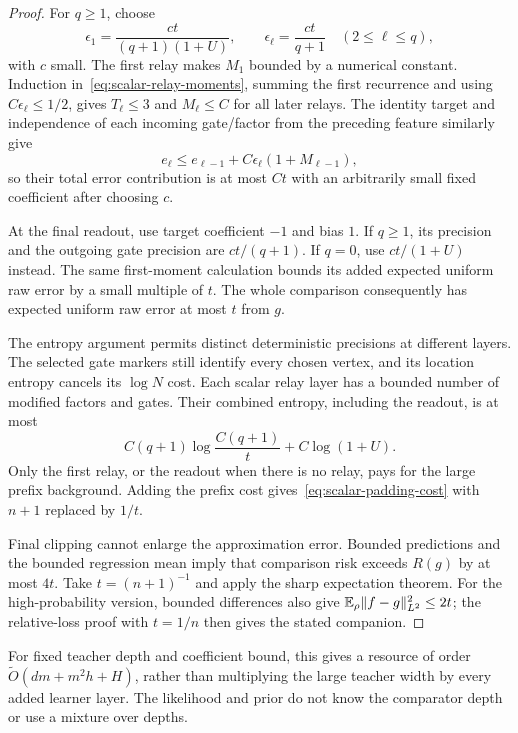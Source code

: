 \begin{proof}
For $q\ge1$, choose
\[
 \epsilon_1=\frac{ct}{(q+1)(1+U)},\qquad
 \epsilon_\ell=\frac{ct}{q+1}\quad(2\le\ell\le q),
\]
with $c$ small. The first relay makes $M_1$ bounded by a numerical constant. Induction in~\eqref{eq:scalar-relay-moments}, summing the first recurrence and using $C\epsilon_\ell\le1/2$, gives $T_\ell\le3$ and $M_\ell\le C$ for all later relays. The identity target and independence of each incoming gate/factor from the preceding feature similarly give
\[
 e_\ell\le e_{\ell-1}+C\epsilon_\ell(1+M_{\ell-1}),
\]
so their total error contribution is at most $Ct$ with an arbitrarily small fixed coefficient after choosing $c$.

At the final readout, use target coefficient $-1$ and bias $1$. If $q\ge1$, its precision and the outgoing gate precision are $ct/(q+1)$. If $q=0$, use $ct/(1+U)$ instead. The same first-moment calculation bounds its added expected uniform raw error by a small multiple of $t$. The whole comparison consequently has expected uniform raw error at most $t$ from $g$.

The entropy argument permits distinct deterministic precisions at different layers. The selected gate markers still identify every chosen vertex, and its location entropy cancels its $\log N$ cost. Each scalar relay layer has a bounded number of modified factors and gates. Their combined entropy, including the readout, is at most
\[
 C(q+1)\log\frac{C(q+1)}t+C\log(1+U).
\]
Only the first relay, or the readout when there is no relay, pays for the large prefix background. Adding the prefix cost gives~\eqref{eq:scalar-padding-cost} with $n+1$ replaced by $1/t$.

Final clipping cannot enlarge the approximation error. Bounded predictions and the bounded regression mean imply that comparison risk exceeds $R(g)$ by at most $4t$. Take $t=(n+1)^{-1}$ and apply the sharp expectation theorem. For the high-probability version, bounded differences also give
$\mathbb E_\rho\|f-g\|_{L^2}^2\le2t$; the relative-loss proof with $t=1/n$ then gives the stated companion.
\end{proof}

For fixed teacher depth and coefficient bound, this gives a resource of order
$\widetilde O(d m+m^2h+H)$, rather than multiplying the large teacher width by every added learner layer. The likelihood and prior do not know the comparator depth or use a mixture over depths.


